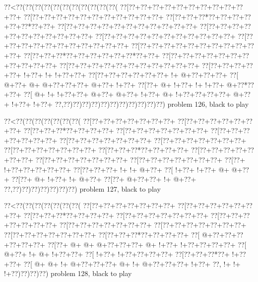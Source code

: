 \vbox{\vbox{\goo
\0??<\0??(\0??(\0??(\0??(\0??(\0??(\0??(\0??(\0??(\0??(\0??(
\0??[\0??+\0??+\0??+\0??+\0??+\0??+\0??+\0??+\0??+\0??+\0??+
\0??[\0??+\0??+\0??+\0??+\0??+\0??+\0??+\0??+\0??+\0??+\0??+
\0??[\0??+\0??+\0??*\0??+\0??+\0??+\0??+\0??+\0??*\0??+\0??+
\0??[\0??+\0??+\0??+\0??+\0??+\0??+\0??+\0??+\0??+\0??+\0??+
\0??[\0??+\0??+\0??+\0??+\0??+\0??+\0??+\0??+\0??+\0??+\0??+
\0??[\0??+\0??+\0??+\0??+\0??+\0??+\0??+\0??+\0??+\0??+\0??+
\0??[\0??+\0??+\0??+\0??+\0??+\0??+\0??+\0??+\0??+\0??+\0??+
\0??[\0??+\0??+\0??+\0??+\0??+\0??+\0??+\0??+\0??+\0??+\0??+
\0??[\0??+\0??+\0??*\0??+\0??+\0??+\0??+\0??+\0??*\0??+\0??+
\0??[\0??+\0??+\0??+\0??+\0??+\0??+\0??+\0??+\0??+\0??+\0??+
\0??[\0??+\0??+\0??+\0??+\0??+\0??+\0??+\0??+\0??+\0??+\0??+
\0??[\0??+\0??+\0??+\0??+\0??+\- !+\0??+\- !+\- !+\0??+\0??+
\0??[\0??+\0??+\0??+\0??+\0??+\0??+\- !+\- @+\0??+\0??+\0??+
\0??[\- @+\0??+\- @+\- @+\0??+\0??+\0??+\- @+\0??+\- !+\0??+
\0??[\0??+\- @+\- !+\0??+\- !+\- !+\0??+\- @+\0??*\0??+\0??+
\0??[\- @+\- !+\- !+\0??+\0??+\- @+\0??+\- @+\0??+\- !+\0??+
\- @+\- !+\0??+\0??+\0??+\0??+\- @+\0??+\- !+\0??+\- !+\0??+
\0??,\0??)\0??)\0??)\0??)\0??)\0??)\0??)\0??)\0??)\0??)\0??)
}
\hfil problem 126, black to play\hfil\break
}

\vbox{\vbox{\goo
\0??<\0??(\0??(\0??(\0??(\0??(\0??(\0??(
\0??[\0??+\0??+\0??+\0??+\0??+\0??+\0??+
\0??[\0??+\0??+\0??+\0??+\0??+\0??+\0??+
\0??[\0??+\0??+\0??*\0??+\0??+\0??+\0??+
\0??[\0??+\0??+\0??+\0??+\0??+\0??+\0??+
\0??[\0??+\0??+\0??+\0??+\0??+\0??+\0??+
\0??[\0??+\0??+\0??+\0??+\0??+\0??+\0??+
\0??[\0??+\0??+\0??+\0??+\0??+\0??+\0??+
\0??[\0??+\0??+\0??+\0??+\0??+\0??+\0??+
\0??[\0??+\0??+\0??*\0??+\0??+\0??+\0??+
\0??[\0??+\0??+\0??+\0??+\0??+\0??+\0??+
\0??[\0??+\0??+\0??+\0??+\0??+\0??+\0??+
\0??[\0??+\0??+\0??+\0??+\0??+\0??+\0??+
\0??[\0??+\- !+\0??+\0??+\0??+\0??+\0??+
\0??[\0??+\0??+\0??+\- !+\- !+\- @+\0??+
\0??[\- !+\0??+\- !+\0??+\- @+\- @+\0??+
\0??[\0??+\- @+\- !+\0??+\- !+\- @+\0??+
\0??[\0??+\- @+\0??+\0??+\- !+\- @+\0??+
\0??,\0??)\0??)\0??)\0??)\0??)\0??)\0??)
}
\hfil problem 127, black to play\hfil\break
}

\vbox{\vbox{\goo
\0??<\0??(\0??(\0??(\0??(\0??(\0??(\0??(
\0??[\0??+\0??+\0??+\0??+\0??+\0??+\0??+
\0??[\0??+\0??+\0??+\0??+\0??+\0??+\0??+
\0??[\0??+\0??+\0??*\0??+\0??+\0??+\0??+
\0??[\0??+\0??+\0??+\0??+\0??+\0??+\0??+
\0??[\0??+\0??+\0??+\0??+\0??+\0??+\0??+
\0??[\0??+\0??+\0??+\0??+\0??+\0??+\0??+
\0??[\0??+\0??+\0??+\0??+\0??+\0??+\0??+
\0??[\0??+\0??+\0??+\0??+\0??+\0??+\0??+
\0??[\0??+\0??+\0??*\0??+\0??+\0??+\0??+
\0??[\- @+\0??+\0??+\0??+\0??+\0??+\0??+
\0??[\0??+\- @+\- @+\- @+\0??+\0??+\0??+
\- @+\- !+\0??+\- !+\0??+\0??+\0??+\0??+
\0??[\- @+\0??+\- !+\- @+\- !+\0??+\0??+
\0??[\- !+\0??+\- !+\0??+\0??+\0??+\0??+
\0??[\0??+\0??+\0??*\0??+\- !+\0??+\0??+
\0??[\- @+\- @+\- !+\- @+\0??+\0??+\0??+
\- @+\- !+\- @+\0??+\0??+\0??+\- !+\0??+
\0??,\- !+\- !+\- !+\0??)\0??)\0??)\0??)
}
\hfil problem 128, black to play\hfil\break
}

